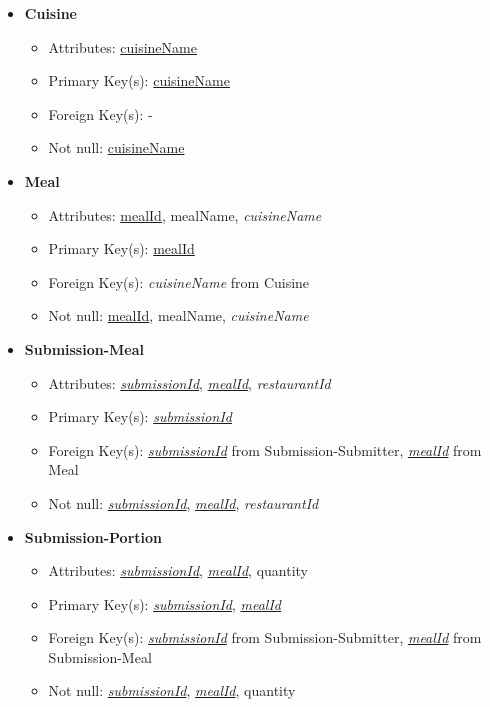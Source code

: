 \documentclass{article}
\begin{document}
\begin{itemize}
        \item \textbf{Cuisine}
        \begin{itemize}
            \item Attributes: \underline{cuisineName}
            \item Primary Key(s): \underline{cuisineName}
            \item Foreign Key(s): -
            \item Not null: \underline{cuisineName}
        \end{itemize}
        
        \item \textbf{Meal}
        \begin{itemize}
            \item Attributes: \underline{mealId}, mealName, \textit{cuisineName}
            \item Primary Key(s): \underline{mealId}
            \item Foreign Key(s): \textit{cuisineName} from Cuisine
            \item Not null: \underline{mealId}, mealName, \textit{cuisineName}
        \end{itemize}

        \item \textbf{Submission-Meal}
        \begin{itemize}
            \item Attributes: \underline{\textit{submissionId}}, \underline{\textit{mealId}}, \textit{restaurantId}
            \item Primary Key(s): \underline{\textit{submissionId}}
            \item Foreign Key(s): \underline{\textit{submissionId}} from Submission-Submitter, \underline{\textit{mealId}} from Meal            
            \item Not null: \underline{\textit{submissionId}}, \underline{\textit{mealId}}, \textit{restaurantId}
        \end{itemize}

        \item \textbf{Submission-Portion}
        \begin{itemize}
            \item Attributes: \underline{\textit{submissionId}}, \underline{\textit{mealId}}, quantity
            \item Primary Key(s): \underline{\textit{submissionId}}, \underline{\textit{mealId}}
            \item Foreign Key(s): \underline{\textit{submissionId}} from Submission-Submitter, \underline{\textit{mealId}} from Submission-Meal
            \item Not null: \underline{\textit{submissionId}}, \underline{\textit{mealId}}, quantity
        \end{itemize}


\end{itemize}
\end{document}
